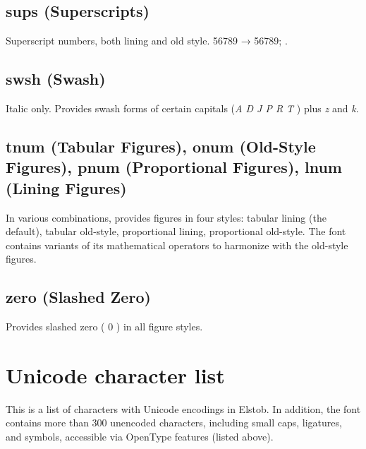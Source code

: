 \documentclass[12pt,letterpaper,openany]{book}
\begin{document}
\section{sups (Superscripts)}
Superscript numbers, both lining and old style. 56789 →
{ 56789};
.

\section{swsh (Swash)}
Italic only. Provides swash forms of certain capitals
{(\textit{A D J P R T} ) plus \textit{z} and \textit{k}.}

\section{tnum (Tabular Figures), onum (Old-Style Figures), pnum (Proportional
Figures), lnum (Lining Figures)}
In various combinations, provides figures in four styles:
tabular lining (the default),
tabular old-style,
proportional lining,
proportional old-style. The font contains variants of its mathematical
operators to harmonize with the old-style figures.

\section{zero (Slashed Zero)}
Provides slashed zero ({ 0 }) in all figure styles.

\chapter{Unicode character list}

This is a list of characters with Unicode encodings in Elstob. In addition, the
font contains more than 300 unencoded characters, including small
caps, ligatures, and symbols, accessible via OpenType features (listed above).
\end{document}

